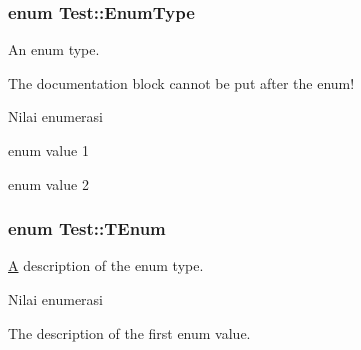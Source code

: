 \subsubsection[{Enum\+Type}]{\setlength{\rightskip}{0pt plus 5cm}enum {\bf Test\+::\+Enum\+Type}}\label{classTest_a26bf93efdaea3c6e2cfa4119c3755d3f}


An enum type. 

The documentation block cannot be put after the enum! \begin{Desc}
\item[Nilai enumerasi]\par
\begin{description}
\item[{\em 
\hypertarget{classTest_a26bf93efdaea3c6e2cfa4119c3755d3faacfab1e4105c05a2e503931a0e82b5b0}{}E\+Val1\label{classTest_a26bf93efdaea3c6e2cfa4119c3755d3faacfab1e4105c05a2e503931a0e82b5b0}
}]enum value 1 \item[{\em 
\hypertarget{classTest_a26bf93efdaea3c6e2cfa4119c3755d3fae2fa04fb1c4db1f7d72b8781ba19ffcc}{}E\+Val2\label{classTest_a26bf93efdaea3c6e2cfa4119c3755d3fae2fa04fb1c4db1f7d72b8781ba19ffcc}
}]enum value 2 \end{description}
\end{Desc}
\hypertarget{classTest_ad8d13fe56b896633273087859b89a1a3}{}
\subsubsection[{T\+Enum}]{\setlength{\rightskip}{0pt plus 5cm}enum {\bf Test\+::\+T\+Enum}}\label{classTest_ad8d13fe56b896633273087859b89a1a3}
\hyperlink{classA}{A} description of the enum type. \begin{Desc}
\item[Nilai enumerasi]\par
\begin{description}
\item[{\em 
\hypertarget{classTest_ad8d13fe56b896633273087859b89a1a3a24d1337b7c053feaf5f44846fb7785a8}{}Val1\label{classTest_ad8d13fe56b896633273087859b89a1a3a24d1337b7c053feaf5f44846fb7785a8}
}]The description of the first enum value. \end{description}
\end{Desc}


